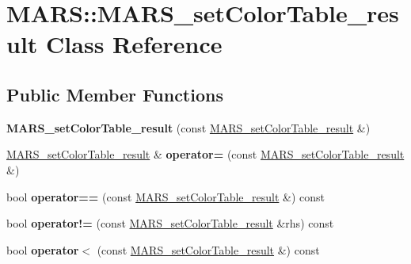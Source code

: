 \hypertarget{classMARS_1_1MARS__setColorTable__result}{}\section{M\+A\+RS\+:\+:M\+A\+R\+S\+\_\+set\+Color\+Table\+\_\+result Class Reference}
\label{classMARS_1_1MARS__setColorTable__result}
\subsection*{Public Member Functions}
\begin{DoxyCompactItemize}
\item 
\mbox{\label{classMARS_1_1MARS__setColorTable__result_aded0609e2aa5fcb99212004051029d09}} 
{\bfseries M\+A\+R\+S\+\_\+set\+Color\+Table\+\_\+result} (const \hyperlink{classMARS_1_1MARS__setColorTable__result}{M\+A\+R\+S\+\_\+set\+Color\+Table\+\_\+result} \&)
\item 
\mbox{\label{classMARS_1_1MARS__setColorTable__result_a80adf3b27f6b8b1422591a9e430ae569}} 
\hyperlink{classMARS_1_1MARS__setColorTable__result}{M\+A\+R\+S\+\_\+set\+Color\+Table\+\_\+result} \& {\bfseries operator=} (const \hyperlink{classMARS_1_1MARS__setColorTable__result}{M\+A\+R\+S\+\_\+set\+Color\+Table\+\_\+result} \&)
\item 
\mbox{\label{classMARS_1_1MARS__setColorTable__result_a5c46b381c9d915b416d81afbf720a605}} 
bool {\bfseries operator==} (const \hyperlink{classMARS_1_1MARS__setColorTable__result}{M\+A\+R\+S\+\_\+set\+Color\+Table\+\_\+result} \&) const
\item 
\mbox{\label{classMARS_1_1MARS__setColorTable__result_ac4a04f332a03da48d73a41b48919322c}} 
bool {\bfseries operator!=} (const \hyperlink{classMARS_1_1MARS__setColorTable__result}{M\+A\+R\+S\+\_\+set\+Color\+Table\+\_\+result} \&rhs) const
\item 
\mbox{\label{classMARS_1_1MARS__setColorTable__result_a17c77fc8c6869be39bbf71a2400b3fc1}} 
bool {\bfseries operator$<$} (const \hyperlink{classMARS_1_1MARS__setColorTable__result}{M\+A\+R\+S\+\_\+set\+Color\+Table\+\_\+result} \&) const

\end{DoxyCompactItemize}
